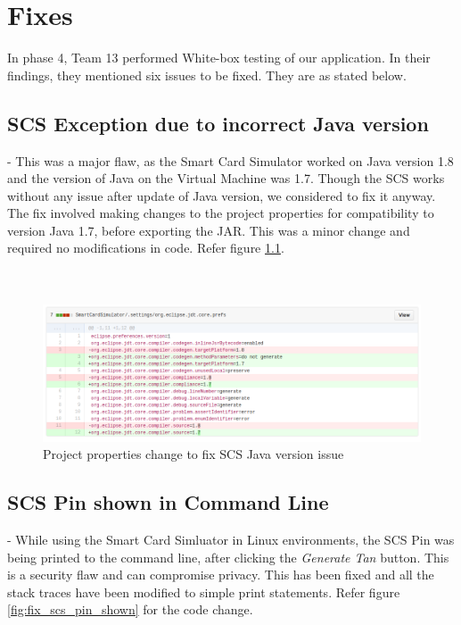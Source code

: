 \chapter{Fixes}

In phase 4, Team 13 performed White-box testing of our application. In their findings, they mentioned six issues to be fixed. They are as stated below.

\section{SCS Exception due to incorrect Java version} - This was a major flaw, as the Smart Card Simulator worked on Java version 1.8 and the version of Java on the Virtual Machine was 1.7. Though the SCS works without any issue after update of Java version, we considered to fix it anyway.
The fix involved making changes to the project properties for compatibility to version Java 1.7, before exporting the JAR. This was a minor change and required no modifications in code. Refer figure \ref{fig:fix_java_version}. \\ \\ \\

\begin{figure}[ht]
	\centering
	\includegraphics[width=.8\linewidth]{figures/fix_java_version.png}
	\caption{Project properties change to fix SCS Java version issue}
	\label{fig:fix_java_version}
\end{figure}

\clearpage

\section{SCS Pin shown in Command Line} - While using the Smart Card Simluator in Linux environments, the SCS Pin was being printed to the command line, after clicking the \textit{Generate Tan} button. This is a security flaw and can compromise privacy. This has been fixed and all the stack traces have been modified to simple print statements. Refer figure \ref{fig:fix_scs_pin_shown} for the code change. \\ \\ \\

